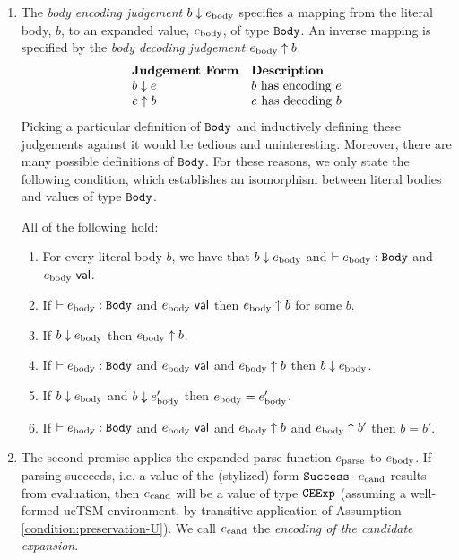 \begin{enumerate}
\item The \emph{body encoding judgement} $b \downarrow e_\text{body}$ specifies a mapping from the literal body, $b$, to an expanded value, $e_\text{body}$, of type $\mathtt{Body}$. An inverse mapping is specified by the \emph{body decoding judgement} $e_\text{body} \uparrow b$.
\[\begin{array}{ll}
\textbf{Judgement Form} & \textbf{Description}\\
b \downarrow e & \text{$b$ has encoding $e$}\\
e \uparrow b & \text{$e$ has decoding $b$}
\end{array}\]
Picking a particular definition of $\mathtt{Body}$ and inductively defining these judgements against it would be tedious and uninteresting. Moreover, there are many possible definitions of $\mathtt{Body}$. For these reasons, we only state  the following condition, which establishes an isomorphism between literal bodies and values of type $\mathtt{Body}$.
\begin{condition} All of the following hold:
\begin{enumerate}
\item For every literal body $b$, we have that $b \downarrow e_\text{body}$ and $\vdash e_\text{body} : \mathtt{Body}$ and $e_\text{body}~\mathsf{val}$.
\item If $\vdash e_\text{body} : \mathtt{Body}$ and $e_\text{body}~\mathsf{val}$ then $e_\text{body} \uparrow b$ for some $b$.
\item If $b \downarrow e_\text{body}$ then $e_\text{body} \uparrow b$.
\item If $\vdash e_\text{body} : \mathtt{Body}$ and $e_\text{body}~\mathsf{val}$ and $e_\text{body} \uparrow b$ then $b \downarrow e_\text{body}$. 
\item If $b \downarrow e_\text{body}$ and $b \downarrow e_\text{body}'$ then $e_\text{body} = e_\text{body}'$.
\item If $\vdash e_\text{body} : \mathtt{Body}$ and $e_\text{body}~\mathsf{val}$ and $e_\text{body} \uparrow b$ and $e_\text{body} \uparrow b'$ then $b=b'$.
\end{enumerate}
\end{condition}
\item The second premise applies the expanded parse function $e_\text{parse}$ to $e_\text{body}$. If parsing succeeds, i.e. a value of the (stylized) form $\mathtt{Success} \cdot e_\text{cand}$ results from evaluation, then $e_\text{cand}$ will be a value of type $\mathtt{CEExp}$ (assuming a well-formed ueTSM environment, by transitive application of Assumption \ref{condition:preservation-U}). We call $e_\text{cand}$ the \emph{encoding of the candidate expansion}.


\end{enumerate}
